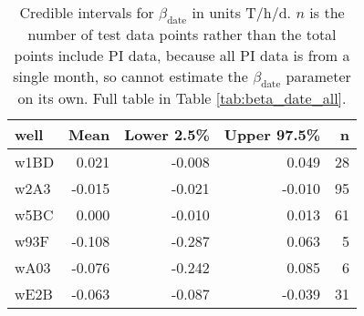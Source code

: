 \begin{table}[h]
\centering
\begin{tabular}{lrrrr}
  \hline
well & Mean & Lower 2.5\% & Upper 97.5\% & n \\ 
  \hline
w1BD & 0.021 & -0.008 & 0.049 &   28 \\ 
  w2A3 & -0.015 & -0.021 & -0.010 &   95 \\ 
  w5BC & 0.000 & -0.010 & 0.013 &   61 \\ 
  w93F & -0.108 & -0.287 & 0.063 &    5 \\ 
  wA03 & -0.076 & -0.242 & 0.085 &    6 \\ 
  wE2B & -0.063 & -0.087 & -0.039 &   31 \\ 
   \hline
\end{tabular}
\caption{Credible intervals for $\beta_\text{date}$ in units T/h/d. $n$ is the number of test data points rather than the total points include PI data, because all PI data is from a single month, so cannot estimate the $\beta_\text{date}$ parameter on its own. Full table in Table \ref{tab:beta_date_all}.} 
\label{tab:beta_date}
\end{table}
